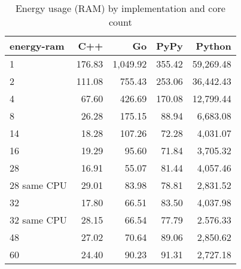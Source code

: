 \begin{table}
    \centering
    \begin{tabular}{lrrrr}
        \hline
        energy-ram      & C++       & Go        & PyPy      & Python      \\
        \hline
        1               &   176.83  & 1,049.92  &   355.42  &  59,269.48  \\
        2               &   111.08  &   755.43  &   253.06  &  36,442.43  \\
        4               &    67.60  &   426.69  &   170.08  &  12,799.44  \\
        8	              &    26.28 	&   175.15  &    88.94  &	  6,683.08  \\
        14              &    18.28  &   107.26  &    72.28  &   4,031.07  \\
        16              &    19.29  &    95.60  &    71.84  &   3,705.32  \\
        28              &    16.91  &    55.07  &    81.44  &   4,057.46  \\
        28 same CPU     &    29.01  &    83.98  &    78.81  &   2,831.52  \\
        32              &    17.80  &    66.51  &    83.50  &   4,037.98  \\
        32 same CPU     &    28.15  &    66.54  &    77.79  &   2.576.33  \\
        48              &    27.02  &    70.64  &    89.06  &   2,850.62  \\
        60              &    24.40  &    90.23  &    91.31  &   2,727.18  \\
        \hline
    \end{tabular}
    \caption{Energy usage (RAM) by implementation and core count}
    \label{tab:server-energy-ram}
\end{table}